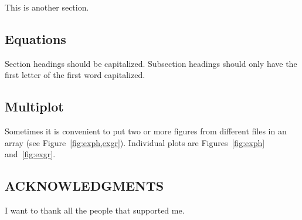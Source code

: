 \begin{summaryenv}
  This is another section.
\end{summaryenv}

\subsection*{Equations}

\begin{summaryenv}
  Section headings should be capitalized. Subsection headings should
  only have the first letter of the first word capitalized.
\end{summaryenv}

\subsection*{Multiplot}

\begin{summaryenv}
  Sometimes it is convenient to put two or more figures from different
  files in an array (see Figure~\ref{fig:exph,exgr}). Individual plots
  are Figures~\ref{fig:exph} and~\ref{fig:exgr}.
\end{summaryenv}

\subsection*{ACKNOWLEDGMENTS}

\begin{summaryenv}
  I want to thank all the people that supported me.
\end{summaryenv}

